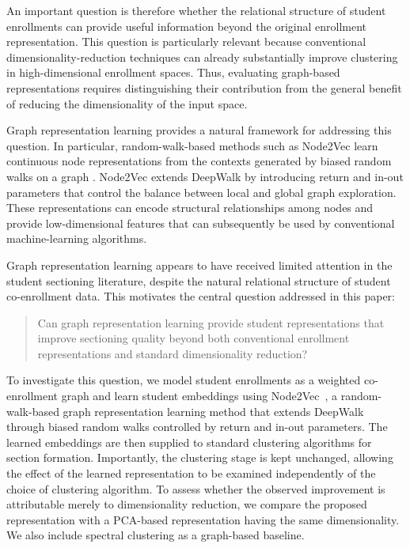 \documentclass[pdflatex,sn-mathphys-num,iicol]{sn-jnl}%
\theoremstyle{thmstyleone}%
\theoremstyle{thmstyletwo}%
\theoremstyle{thmstylethree}%
\begin{document}
An important question is therefore whether the relational structure of student enrollments can provide useful information beyond the original enrollment representation. This question is particularly relevant because conventional dimensionality-reduction techniques can already substantially improve clustering in high-dimensional enrollment spaces. Thus, evaluating graph-based representations requires distinguishing their contribution from the general benefit of reducing the dimensionality of the input space.

Graph representation learning provides a natural framework for addressing this question. In particular, random-walk-based methods such as Node2Vec learn continuous node representations from the contexts generated by biased random walks on a graph \cite{perozzi2014deepwalk,node2vec_grover2016}. Node2Vec extends DeepWalk by introducing return and in-out parameters that control the balance between local and global graph exploration. These representations can encode structural relationships among nodes and provide low-dimensional features that can subsequently be used by conventional machine-learning algorithms.

Graph representation learning appears to have received limited attention in the student sectioning literature, despite the natural relational structure of student co-enrollment data. This motivates the central question addressed in this paper:

\begin{quotation}
Can graph representation learning provide student representations that improve sectioning quality beyond both conventional enrollment representations and standard dimensionality reduction?
\end{quotation}

To investigate this question, we model student enrollments as a weighted co-enrollment graph and learn student embeddings using Node2Vec~\cite{node2vec_grover2016}, a random-walk-based graph representation learning method that extends DeepWalk~\cite{perozzi2014deepwalk} through biased random walks controlled by return and in-out parameters. The learned embeddings are then supplied to standard clustering algorithms for section formation. Importantly, the clustering stage is kept unchanged, allowing the effect of the learned representation to be examined independently of the choice of clustering algorithm. To assess whether the observed improvement is attributable merely to dimensionality reduction, we compare the proposed representation with a PCA-based representation having the same dimensionality. We also include spectral clustering as a graph-based baseline.
\end{document}
